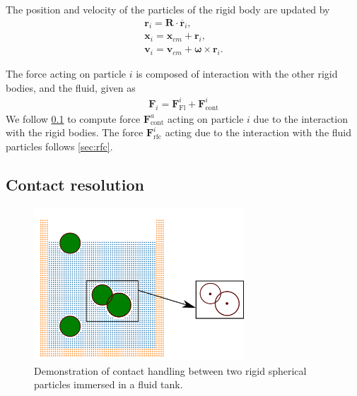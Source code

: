 \documentclass[preprint,12pt]{elsarticle}
\newcommand{\teng}[1]{\ensuremath{\boldsymbol{#1}}}
\newcommand{\ten}[1]{\ensuremath{\mathbf{#1}}}
\begin{document}
The position and velocity of the particles of the rigid body are updated by
\begin{eqnarray}
  \label{eq:rfc:rb_particle_pos_update}
  \ten{r}_i = \ten{R} \cdot \overline{\ten{r}}_{i},\\
  \ten{x}_i = \ten{x}_{cm} + \ten{r}_{i},\\
  \ten{v}_i = \ten{v}_{cm} + \teng{\omega} \times \ten{r}_{i}.
\end{eqnarray}

The force acting on particle $i$ is composed of interaction with the other rigid
bodies, and the fluid, given as
\begin{eqnarray}
  \label{eq:rfc:rb_particle_pos_update}
  \ten{F}_i = \ten{F}_{\text{Fl}}^i + \ten{F}_{\text{cont}}^i
\end{eqnarray}
We follow \cref{sec:dem} to compute force
$\ten{F}_{\text{cont}}^a$ acting on particle $i$ due to the interaction with
the rigid bodies. The force $\ten{F}_{\text{rfc}}^i$ acting due to the
interaction with the fluid particles follows \cref{sec:rfc}.



\FloatBarrier%
\subsection{Contact resolution}
\label{sec:dem}

\begin{figure}[!htpb]
  \centering
  \includegraphics[width=0.7\textwidth]{images/spherical_particles_dem_representation}
  \caption{Demonstration of contact handling between two rigid spherical
    particles immersed in a fluid tank.}
  \label{fig:spherical-particles-in-tank-dem}
\end{figure}
\end{document}
